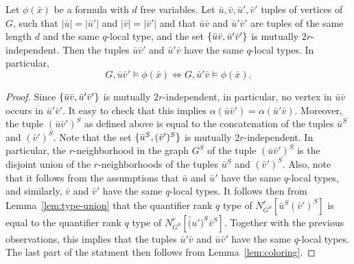\begin{lemma}\label{lem:crossing}	Let $\phi(\bar x)$ be a formula with
	 $d$ free variables.
  Let $\bar u,\bar v,\bar u',\bar v'$ tuples of vertices of $G$,
  such that $|\bar u|=|\bar u'|$ and $|\bar v|=|\bar v'|$ and that $\bar u\bar v$ and $\bar u'\bar v'$ 
  are tuples of the same length $d$ and the same $q$-local type, and the set $\{\bar u\bar v,\bar u'\bar v'\}$
  is mutually $2r$-independent. Then 
  the tuples $\bar u\bar v'$ and $\bar u'\bar v$
  have the same $q$-local types. In particular, 
$$G,\bar u\bar v'\models \phi(\bar x)\iff G,\bar u'\bar v\models \phi(\bar x).$$
\end{lemma}
\begin{proof}
Since $\{\bar u\bar v,\bar u'\bar v'\}$ is mutually $2r$-independent, in particular, no vertex in $\bar u\bar v$ occurs in $\bar u'\bar v'$.
It easy to check that this implies $\alpha(\bar u\bar v')=\alpha(\bar u'\bar v)$.
Moreover, the tuple $(\bar u\bar v')^S$ as defined above 
is equal to the concatenation of the tuples $\bar u^S$
and $(\bar v')^S$.
Note that the set  $\{\bar u^S,(\bar v')^S\}$ is mutually $2r$-independent. In particular, the  $r$-neighborhood in the graph $G^S$
of the tuple $(\bar u\bar v')^S$
is the disjoint union of the $r$-neighborhoods
of the tuples $\bar u^S$ and $(\bar v')^S$.
Also, note that it follows from the assumptions that $\bar u$ and $\bar u'$ have the same $q$-local types,
and similarly, $\bar v$ and $\bar v'$ have the same $q$-local types.
It follows then from Lemma~\ref{lem:type-union} that
the quantifier rank $q$ type of $N^r_{G^S}[\bar u^S(\bar  v')^S]$ is equal to the quantifier rank $q$ type of 
$N^r_{G^S}[\bar (u')^S\bar  v^S]$. 
Together with the previous observations, this implies that the tuples $\bar u'\bar v$ and $\bar u\bar v'$
have the same $q$-local types. The last part of the statment then follows from Lemma~\ref{lem:coloring}.
\end{proof}




